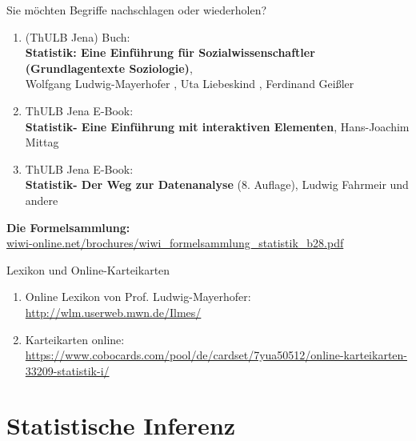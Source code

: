 \documentclass[usenames,dvipsnames,handout]{beamer}
\begin{document}
\begin{frame}{Sie möchten Begriffe  nachschlagen
oder wiederholen?}
\begin{enumerate}
\item{(ThULB Jena) Buch:\\ \textbf{Statistik: Eine Einführung für Sozialwissenschaftler (Grundlagentexte Soziologie)},\\
 Wolfgang Ludwig-Mayerhofer , Uta Liebeskind , Ferdinand Geißler }\pause
 \item{ThULB Jena E-Book: \\
 \textbf{Statistik-
 Eine Einführung mit interaktiven Elementen}, Hans-Joachim Mittag}\\ \pause
   \item{ThULB Jena E-Book: \\
   \textbf{Statistik- Der Weg zur Datenanalyse} (8. Auflage), Ludwig Fahrmeir und andere}\pause
\end{enumerate}
\small
\colorbox{yellow!40}{ \textbf{Die Formelsammlung:}} \\ \colorbox{yellow!40}{ \url{wiwi-online.net/brochures/wiwi_formelsammlung_statistik_b28.pdf}} 
\end{frame}

\begin{frame}{Lexikon und Online-Karteikarten}
\begin{enumerate}
\item{Online Lexikon von Prof. Ludwig-Mayerhofer: \url{http://wlm.userweb.mwn.de/Ilmes/}}\pause
\item{Karteikarten online: \url{https://www.cobocards.com/pool/de/cardset/7yua50512/online-karteikarten-33209-statistik-i/}}
\end{enumerate}
\end{frame}
\section{Statistische Inferenz}
\end{document}
